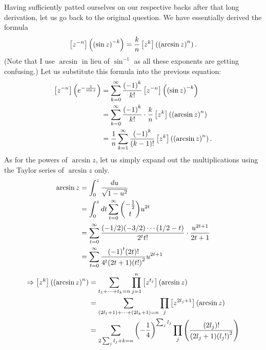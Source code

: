 Having sufficiently patted ourselves on our respective backs after that long derivation,
let us go back to the original question.
We have essentially derived the formula
\[
    \left[ z^{-n} \right] \left( {(\sin z)}^{-k} \right) = \frac{k}{n} \left[ z^{k} \right] \left( {(\arcsin z)}^n \right).
\]
(Note that I use $\arcsin$ in lieu of $\sin^{-1}$ as all these exponents are getting confusing.)
Let us substitute this formula into the previous equation:
\begin{align*}
    \left[ z^{-n} \right] \left( e^{-\frac{1}{\sin z}} \right)
    &= \sum_{k=0}^\infty \frac{{(-1)}^k}{k!} \left[ z^{-n} \right] \left( {(\sin z)}^{-k} \right) \\
    &= \sum_{k=0}^\infty \frac{{(-1)}^k}{k!} \cdot \frac{k}{n} \left[ z^{k} \right] \left( {(\arcsin z)}^n \right) \\
    &= \frac{1}{n} \sum_{k=1}^\infty \frac{{(-1)}^k}{(k-1)!} \left[ z^{k} \right] \left( {(\arcsin z)}^n \right).
\end{align*}
As for the powers of $\arcsin z$, let us simply expand out the multiplications
using the Taylor series of $\arcsin z$ only.
\begin{align*}
    \arcsin z
    &= \int_0^z \frac{du}{\sqrt{1 - u^2}} \\
    &= \int_0^z dt \sum_{t=0}^\infty \binom{-\frac{1}{2}}{t} u^{2t} \\
    &= \sum_{t=0}^\infty \frac{(-1/2) (-3/2) \cdots (1/2 - t)}{2^t t!} \cdot \frac{u^{2t + 1}}{2t + 1} \\
    &= \sum_{t=0}^\infty \frac{{(-1)}^t (2t)!}{4^t (2t+1) {(t!)}^2} u^{2t + 1}
\end{align*}
\begin{align*}
    \Rightarrow \left[ z^{k} \right] \left( {(\arcsin z)}^n \right)
    &= \sum_{t_1 + \cdots + t_k = n} \prod_{j=1}^n \left[ z^{t_j} \right] \left( \arcsin z \right) \\
    &= \sum_{(2l_1 + 1) + \cdots + (2l_k + 1) = n} \prod_j \left[ z^{2l_j + 1} \right] \left( \arcsin z \right) \\
    &= \sum_{2\sum_j l_j + k = n} {\left( -\frac{1}{4} \right)}^{\sum_j l_j}
       \prod_j \left( \frac{(2l_j)!}{(2l_j + 1) {(l_j !)}^2} \right)
\end{align*}
